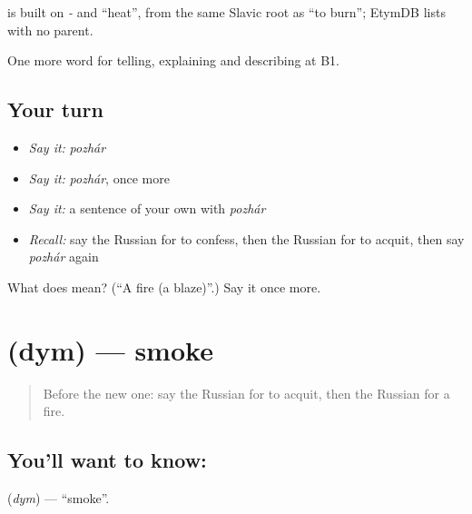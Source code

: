 \begin{cousinweb}
\emph{} is built on \emph{-} and \emph{} \textquotedblleft{}heat\textquotedblright{}, from the same Slavic root as \emph{} \textquotedblleft{}to burn\textquotedblright{}; EtymDB lists \emph{} with no parent.
\end{cousinweb}

\begin{grammarlens}[title={What you've built}]
One more word for telling, explaining and describing at B1.
\end{grammarlens}

\subsection*{Your turn}
\begin{itemize}
\raggedright
  \item \emph{Say it:} \emph{pozhár}
  \item \emph{Say it:} \emph{pozhár}, once more
  \item \emph{Say it:} a sentence of your own with \emph{pozhár}
  \item \emph{Recall:} say the Russian for to confess, then the Russian for to acquit, then say \emph{pozhár} again
\end{itemize}

\begin{tcolorbox}[breakable,colback=teal!4,colframe=teal!35!black,title={Before you move on}]
What does  mean? (\textquotedblleft{}A fire (a blaze)\textquotedblright{}.) Say it once more.
\end{tcolorbox}
\section[\texorpdfstring{\ru{дым} (dym)}{дым (dym)}]{ (dym) — smoke}

\label{lesson:RU-C295-dym}



\begin{quote}
Before the new one: say the Russian for to acquit, then the Russian for a fire.
\end{quote}

\subsection*{You'll want to know: }
\textbf{} (\emph{dym}) — \textquotedblleft{}smoke\textquotedblright{}.


